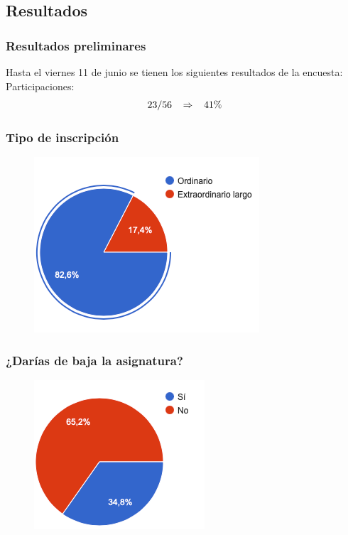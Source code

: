 \subsection{Resultados}
\begin{frame}
\frametitle{Resultados preliminares}
Hasta el viernes 11 de junio se tienen los siguientes resultados de la encuesta:
\\
\bigskip
\pause
Participaciones: 
\begin{align*}
23/56 \hspace{0.3cm} \Rightarrow \hspace{0.3cm} 41 \% 
\end{align*}
\end{frame}
\begin{frame}
\frametitle{Tipo de inscripción}
\begin{figure}
    \centering
    \includegraphics[scale=0.8]{Imagenes/Encuesta_Asesorias_01.png}
\end{figure}
\end{frame}
\begin{frame}
\frametitle{¿Darías de baja la asignatura?}
\begin{figure}
    \centering
    \includegraphics[scale=0.8]{Imagenes/Encuesta_Asesorias_02.png}
\end{figure}
\end{frame}
